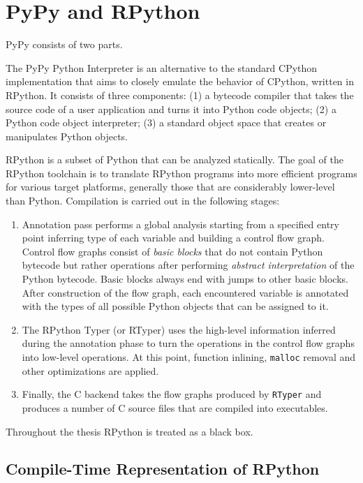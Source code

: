 \chapter{PyPy and RPython}
PyPy consists of two parts.

The PyPy Python Interpreter is an alternative to the standard CPython implementation that aims to closely emulate the behavior of CPython, written in RPython. It consists of three components: (1) a bytecode compiler that takes the source code of a user application and turns it into Python code objects; (2) a Python code object interpreter; (3) a standard object space that creates or manipulates Python objects.

RPython is a subset of Python that can be analyzed statically. The goal of the RPython toolchain is to translate RPython programs into more efficient programs for various target platforms, generally those that are considerably lower-level than Python. Compilation is carried out in the following stages:

\begin{enumerate}
\item Annotation pass performs a global analysis starting from a specified entry point inferring type of each variable and building a control flow graph. Control flow graphs consist of \textit{basic blocks} that do not contain Python bytecode but rather operations after performing \textit{abstract interpretation} of the Python bytecode. Basic blocks always end with jumps to other basic blocks. After construction of the flow graph, each encountered variable is annotated with the types of all possible Python objects that can be assigned to it.

\item
The RPython Typer (or RTyper) uses the high-level information inferred during the annotation phase to turn the operations in the control flow graphs into low-level operations. At this point, function inlining, \texttt{malloc} removal and other optimizations are applied.

\item
Finally, the C backend takes the flow graphs produced by \texttt{RTyper} and produces a number of C source files that are compiled into executables.
\end{enumerate}

Throughout the thesis RPython is treated as a black box.

\section{Compile-Time Representation of RPython}

